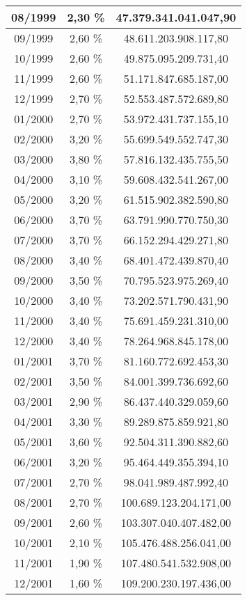 \begin{center}
\begin{longtable}{|c|c|c|}
08/1999 & 2,30 \% & 47.379.341.041.047,90 \\ \hline
09/1999 & 2,60 \% & 48.611.203.908.117,80 \\ \hline
10/1999 & 2,60 \% & 49.875.095.209.731,40 \\ \hline
11/1999 & 2,60 \% & 51.171.847.685.187,00 \\ \hline
12/1999 & 2,70 \% & 52.553.487.572.689,80 \\ \hline
01/2000 & 2,70 \% & 53.972.431.737.155,10 \\ \hline
02/2000 & 3,20 \% & 55.699.549.552.747,30 \\ \hline
03/2000 & 3,80 \% & 57.816.132.435.755,50 \\ \hline
04/2000 & 3,10 \% & 59.608.432.541.267,00 \\ \hline
05/2000 & 3,20 \% & 61.515.902.382.590,80 \\ \hline
06/2000 & 3,70 \% & 63.791.990.770.750,30 \\ \hline
07/2000 & 3,70 \% & 66.152.294.429.271,80 \\ \hline
08/2000 & 3,40 \% & 68.401.472.439.870,40 \\ \hline
09/2000 & 3,50 \% & 70.795.523.975.269,40 \\ \hline
10/2000 & 3,40 \% & 73.202.571.790.431,90 \\ \hline
11/2000 & 3,40 \% & 75.691.459.231.310,00 \\ \hline
12/2000 & 3,40 \% & 78.264.968.845.178,00 \\ \hline
01/2001 & 3,70 \% & 81.160.772.692.453,30 \\ \hline
02/2001 & 3,50 \% & 84.001.399.736.692,60 \\ \hline
03/2001 & 2,90 \% & 86.437.440.329.059,60 \\ \hline
04/2001 & 3,30 \% & 89.289.875.859.921,80 \\ \hline
05/2001 & 3,60 \% & 92.504.311.390.882,60 \\ \hline
06/2001 & 3,20 \% & 95.464.449.355.394,10 \\ \hline
07/2001 & 2,70 \% & 98.041.989.487.992,40 \\ \hline
08/2001 & 2,70 \% & 100.689.123.204.171,00 \\ \hline
09/2001 & 2,60 \% & 103.307.040.407.482,00 \\ \hline
10/2001 & 2,10 \% & 105.476.488.256.041,00 \\ \hline
11/2001 & 1,90 \% & 107.480.541.532.908,00 \\ \hline
12/2001 & 1,60 \% & 109.200.230.197.436,00 \\ \hline

\end{longtable}
\end{center}
